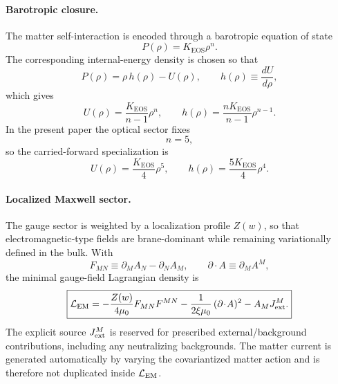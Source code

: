 \documentclass[11pt]{article}
\newcommand{\Zloc}{Z}
\newcommand{\KEOS}{K_{\mathrm{EOS}}}
\begin{document}
\paragraph{Barotropic closure.}
The matter self-interaction is encoded through a barotropic equation of state
\begin{equation}
P(\rho)=\KEOS \rho^n.
\label{eq:app-eos}
\end{equation}
The corresponding internal-energy density is chosen so that
\begin{equation}
P(\rho)=\rho\,h(\rho)-U(\rho),
\qquad
h(\rho)\equiv \frac{dU}{d\rho},
\label{eq:app-thermo-identity}
\end{equation}
which gives
\begin{equation}
U(\rho)=\frac{\KEOS}{n-1}\rho^n,
\qquad
h(\rho)=\frac{n\KEOS}{n-1}\rho^{n-1}.
\label{eq:app-U-h-general}
\end{equation}
In the present paper the optical sector fixes
\begin{equation}
n=5,
\end{equation}
so the carried-forward specialization is
\begin{equation}
U(\rho)=\frac{\KEOS}{4}\rho^5,
\qquad
h(\rho)=\frac{5\KEOS}{4}\rho^4.
\label{eq:app-U-h-n5}
\end{equation}

\paragraph{Localized Maxwell sector.}
The gauge sector is weighted by a localization profile \(\Zloc(w)\), so that
electromagnetic-type fields are brane-dominant while remaining variationally defined in
the bulk. With
\begin{equation}
F_{MN}\equiv \partial_M A_N-\partial_N A_M,
\qquad
\partial\!\cdot\!A\equiv \partial_M A^M,
\label{eq:app-FMN}
\end{equation}
the minimal gauge-field Lagrangian density is
\begin{equation}
\boxed{
\mathcal L_{\rm EM}
=
-\frac{\Zloc(w)}{4\mu_0}F_{MN}F^{MN}
-\frac{1}{2\xi\mu_0}\,(\partial\!\cdot\!A)^2
- A_M J_{\rm ext}^M.
}
\label{eq:app-LEM}
\end{equation}
The explicit source \(J_{\rm ext}^M\) is reserved for prescribed external/background
contributions, including any neutralizing backgrounds. The matter current is generated
automatically by varying the covariantized matter action and is therefore not duplicated
inside \(\mathcal L_{\rm EM}\).
\end{document}
